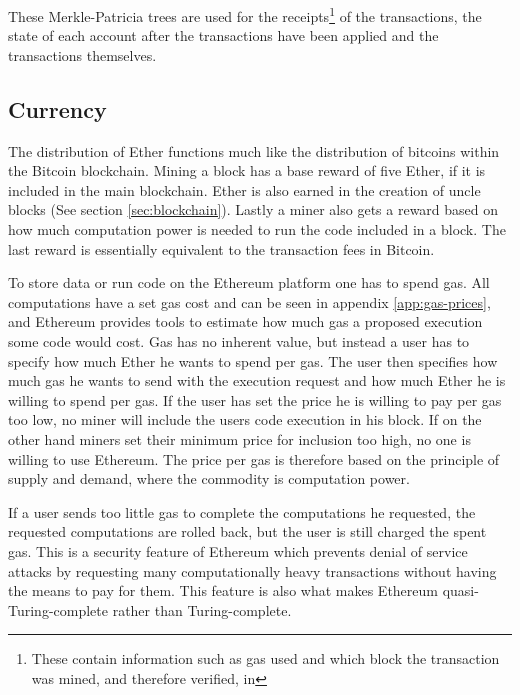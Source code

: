\documentclass{article}
\begin{document}
			These Merkle-Patricia trees are used for the receipts\footnote{These contain information such as gas used and which block the transaction was mined, and therefore verified, in} of the transactions, the state of each account after the transactions have been applied and the transactions themselves.

		\subsection{Currency}
		The distribution of Ether functions much like the distribution of bitcoins within the Bitcoin blockchain. 
		Mining a block has a base reward of five Ether, if it is included in the main blockchain.
		Ether is also earned in the creation of uncle blocks (See section \ref{sec:blockchain}).
		Lastly a miner also gets a reward based on how much computation power is needed to run the code included in a block. 
		The last reward is essentially equivalent to the transaction fees in Bitcoin.

		To store data or run code on the Ethereum platform one has to spend gas. 
		All computations have a set gas cost and can be seen in appendix \ref{app:gas-prices}, and Ethereum provides tools to estimate how much gas a proposed execution some code would cost.
		Gas has no inherent value, but instead a user has to specify how much Ether he wants to spend per gas. 
		The user then specifies how much gas he wants to send with the execution request and how much Ether he is willing to spend per gas. If the user has set the price he is willing to pay per gas too low, no miner will include the users code execution in his block.
		If on the other hand miners set their minimum price for inclusion too high, no one is willing to use Ethereum. 
		The price per gas is therefore based on the principle of supply and demand, where the commodity is computation power.

		If a user sends too little gas to complete the computations he requested, the requested computations are rolled back, but the user is still charged the spent gas.
		This is a security feature of Ethereum which prevents denial of service attacks by requesting many computationally heavy transactions without having the means to pay for them. 
		This feature is also what makes Ethereum quasi-Turing-complete rather than Turing-complete.
\end{document}
